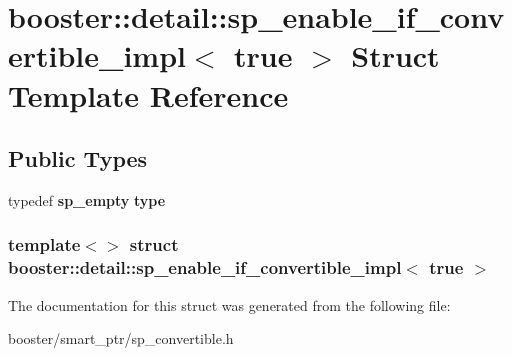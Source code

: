 \section{booster\-:\-:detail\-:\-:sp\-\_\-enable\-\_\-if\-\_\-convertible\-\_\-impl$<$ true $>$ \-Struct \-Template \-Reference}
\label{structbooster_1_1detail_1_1sp__enable__if__convertible__impl_3_01true_01_4}
\subsection*{\-Public \-Types}
\begin{DoxyCompactItemize}
\item 
typedef {\bf sp\-\_\-empty} {\bfseries type}\label{structbooster_1_1detail_1_1sp__enable__if__convertible__impl_3_01true_01_4_a77e77502ef1d78384dd43603333cb058}

\end{DoxyCompactItemize}
\subsubsection*{template$<$$>$ struct booster\-::detail\-::sp\-\_\-enable\-\_\-if\-\_\-convertible\-\_\-impl$<$ true $>$}



\-The documentation for this struct was generated from the following file\-:\begin{DoxyCompactItemize}
\item 
booster/smart\-\_\-ptr/sp\-\_\-convertible.\-h\end{DoxyCompactItemize}
